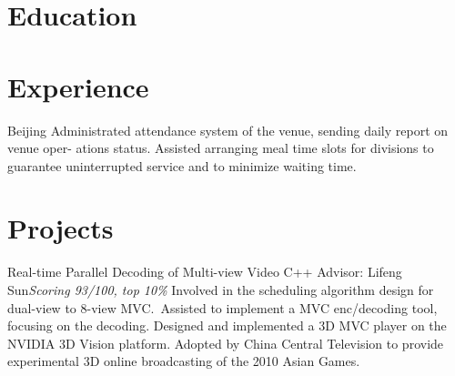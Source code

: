 \documentclass[11pt,a4paper]{moderncv/moderncv}
\begin{document}
\maketitle

\section{Education}


\section{Experience}
{Beijing}{}
{
  Administrated attendance system of the venue, sending daily report on venue oper- ations status.
  Assisted arranging meal time slots for divisions to guarantee uninterrupted service and to minimize waiting time.
}


\section{Projects}

{Real-time Parallel Decoding of Multi-view Video}
{C++}
{Advisor: Lifeng Sun}{\textit{Scoring 93/100, top 10\%}}
{
  Involved in the scheduling algorithm design for dual-view to 8-view MVC.\
  Assisted to implement a MVC enc/decoding tool, focusing on the decoding.
  Designed and implemented a 3D MVC player on the NVIDIA 3D Vision platform.
  Adopted by China Central Television to provide experimental 3D online broadcasting of the 2010 Asian Games.
}
\end{document}
